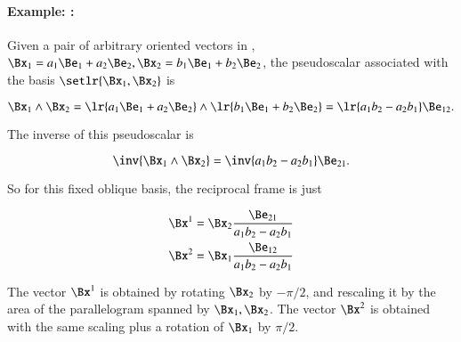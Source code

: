 \paragraph{Example: :}

Given a pair of arbitrary oriented vectors in , \( \Bx_1 = a_1 \Be_1 + a_2 \Be_2, \Bx_2 = b_1 \Be_1 + b_2 \Be_2 \), the pseudoscalar associated with the basis \( \setlr{ \Bx_1, \Bx_2} \) is

\begin{dmath}\label{eqn:reciprocal_R2:260}
\Bx_1 \wedge \Bx_2
=
\lr{ a_1 \Be_1 + a_2 \Be_2 } \wedge \lr{ b_1 \Be_1 + b_2 \Be_2 }
=
\lr{ a_1 b_2 - a_2 b_1 } \Be_{12}.
\end{dmath}

The inverse of this pseudoscalar is

\begin{dmath}\label{eqn:reciprocal_R2:280}
\inv{\Bx_1 \wedge \Bx_2 }
=
\inv{ a_1 b_2 - a_2 b_1 } \Be_{21}.
\end{dmath}

So for this fixed oblique  basis, the reciprocal frame is just

\begin{dmath}\label{eqn:reciprocal_R2:300}
\begin{aligned}
\Bx^1 &= \Bx_2 \frac{\Be_{21}}{ a_1 b_2 - a_2 b_1 } \\
\Bx^2 &= \Bx_1 \frac{\Be_{12}}{ a_1 b_2 - a_2 b_1 }
\end{aligned}
\end{dmath}

The vector \( \Bx^1 \) is obtained by rotating \( \Bx_2 \) by \( -\pi/2 \), and rescaling it by the area of the parallelogram spanned by \( \Bx_1, \Bx_2 \).
The vector \( \Bx^2 \) is obtained with the same scaling plus a rotation of \( \Bx_1 \) by \( \pi/2 \).

